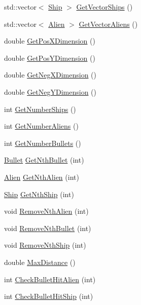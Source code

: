 \begin{DoxyCompactItemize}
\item 
std\-::vector$<$ \hyperlink{classShip}{Ship} $>$ \hyperlink{classBoard_adfbd6c6064986d8b81c3223539d40e1e}{Get\-Vector\-Ships} ()
\item 
std\-::vector$<$ \hyperlink{classAlien}{Alien} $>$ \hyperlink{classBoard_a60a872b112f991ca336ccccf33d05586}{Get\-Vector\-Aliens} ()
\item 
double \hyperlink{classBoard_a0d07f4d616e272a1af348b9baa4fbae8}{Get\-Pos\-X\-Dimension} ()
\item 
double \hyperlink{classBoard_acab8c54eb132148f63e7a2960e0ebf3b}{Get\-Pos\-Y\-Dimension} ()
\item 
double \hyperlink{classBoard_aa1d930101bd156faad5ae1be82d30bbd}{Get\-Neg\-X\-Dimension} ()
\item 
double \hyperlink{classBoard_ab0bb449aabb539140862a7ceafaea760}{Get\-Neg\-Y\-Dimension} ()
\item 
int \hyperlink{classBoard_a964557fa031a2e5bdc0b2373b6201124}{Get\-Number\-Ships} ()
\item 
int \hyperlink{classBoard_a730d8217b0c91db0e107fefd72d07d9c}{Get\-Number\-Aliens} ()
\item 
int \hyperlink{classBoard_af62cea43d3a2678ea4c26f0f97a60835}{Get\-Number\-Bullets} ()
\item 
\hyperlink{classBullet}{Bullet} \hyperlink{classBoard_a1bc49df815ee87e82febb809740bd18c}{Get\-Nth\-Bullet} (int)
\item 
\hyperlink{classAlien}{Alien} \hyperlink{classBoard_a30f5a1320952251822682bac58997802}{Get\-Nth\-Alien} (int)
\item 
\hyperlink{classShip}{Ship} \hyperlink{classBoard_aded42838351e68d691569ecb86a457f6}{Get\-Nth\-Ship} (int)
\item 
void \hyperlink{classBoard_a292c52a3ce8f34d2c9de72243b674a22}{Remove\-Nth\-Alien} (int)
\item 
void \hyperlink{classBoard_a8e4af42b6e217b7a9c0ddd2919af5e4e}{Remove\-Nth\-Bullet} (int)
\item 
void \hyperlink{classBoard_a6015ff8cd657852d0cfd2b849346256f}{Remove\-Nth\-Ship} (int)
\item 
double \hyperlink{classBoard_a284e60b74483ab485df669249d215ce7}{Max\-Distance} ()
\item 
int \hyperlink{classBoard_a429eee3494a6d2f0537a9090d8234e7c}{Check\-Bullet\-Hit\-Alien} (int)
\item 
int \hyperlink{classBoard_a54db8325f1f8469ed203d2a7d92173e0}{Check\-Bullet\-Hit\-Ship} (int)
\item 

\end{DoxyCompactItemize}
